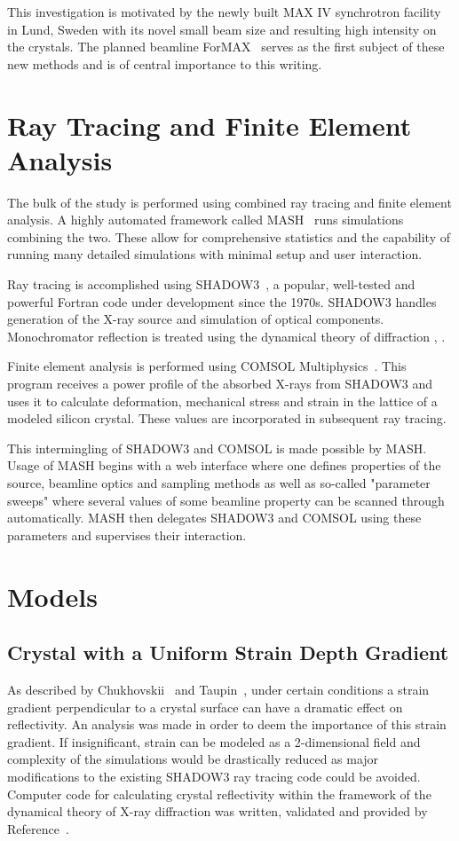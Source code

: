 \documentclass[preprint]{iucr}              %
\begin{document}
This investigation is motivated by the newly built MAX IV synchrotron facility in Lund, Sweden with its novel small beam size and resulting high intensity on the crystals. The planned beamline ForMAX~\cite{formax} serves as the first subject of these new methods and is of central importance to this writing.
\section{Ray Tracing and Finite Element Analysis}

The bulk of the study is performed using combined ray tracing and finite element analysis. A highly automated framework called MASH~\cite{mash} runs simulations combining the two. These allow for comprehensive statistics and the capability of running many detailed simulations with minimal setup and user interaction.

Ray tracing is accomplished using SHADOW3~\cite{shadow3}, a popular, well-tested and powerful Fortran code under development since the 1970s. SHADOW3 handles generation of the X-ray source and simulation of optical components. Monochromator reflection is treated using the dynamical theory of diffraction \cite{dynamicaltheory}, \cite{asymmetricdiffraction}.

Finite element analysis is performed using COMSOL Multiphysics~\cite{comsol}. This program receives a power profile of the absorbed X-rays from SHADOW3 and uses it to calculate deformation, mechanical stress and strain in the lattice of a modeled silicon crystal. These values are incorporated in subsequent ray tracing.

This intermingling of SHADOW3 and COMSOL is made possible by MASH. Usage of MASH begins with a web interface where one defines properties of the source, beamline optics and sampling methods as well as so-called "parameter sweeps" where several values of some beamline property can be scanned through automatically. MASH then delegates SHADOW3 and COMSOL using these parameters and supervises their interaction.
\section{Models}

\subsection{Crystal with a Uniform Strain Depth Gradient}\label{strain_gradient} 
As described by Chukhovskii~\cite{Chukhovskii} and Taupin~\cite{Taupin}, under certain conditions a strain gradient perpendicular to a crystal surface can have a dramatic effect on reflectivity. An analysis was made in order to deem the importance of this strain gradient. If insignificant, strain can be modeled as a 2-dimensional field and complexity of the simulations would be drastically reduced as major modifications to the existing SHADOW3 ray tracing code could be avoided. Computer code for calculating crystal reflectivity within the framework of the dynamical theory of X-ray diffraction was written, validated and provided by Reference~\cite{coins}.
\end{document}
